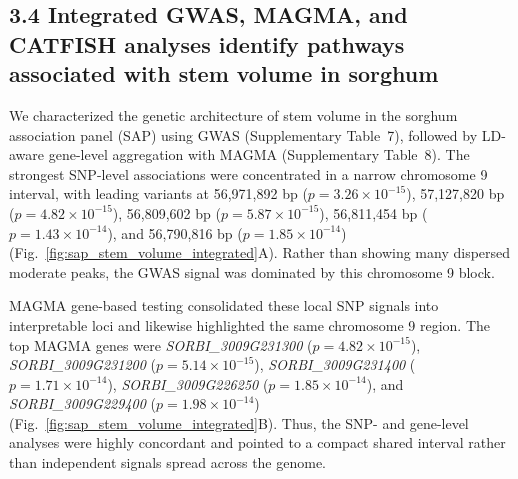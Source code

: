 \documentclass[unnumsec,webpdf,contemporary,large]{oup-authoring-template}%
\theoremstyle{thmstyleone}%
\theoremstyle{thmstyletwo}%
\theoremstyle{thmstylethree}%
\begin{document}
\subsection{3.4 Integrated GWAS, MAGMA, and CATFISH analyses identify pathways associated with stem volume in sorghum}

We characterized the genetic architecture of stem volume in the sorghum association panel (SAP) using GWAS (Supplementary Table~7), followed by LD-aware gene-level aggregation with MAGMA (Supplementary Table~8). The strongest SNP-level associations were concentrated in a narrow chromosome 9 interval, with leading variants at 56,971,892 bp ($p = 3.26 \times 10^{-15}$), 57,127,820 bp ($p = 4.82 \times 10^{-15}$), 56,809,602 bp ($p = 5.87 \times 10^{-15}$), 56,811,454 bp ($p = 1.43 \times 10^{-14}$), and 56,790,816 bp ($p = 1.85 \times 10^{-14}$) (Fig.~\ref{fig:sap_stem_volume_integrated}A). Rather than showing many dispersed moderate peaks, the GWAS signal was dominated by this chromosome 9 block.

MAGMA gene-based testing consolidated these local SNP signals into interpretable loci and likewise highlighted the same chromosome 9 region. The top MAGMA genes were \textit{SORBI\_3009G231300} ($p = 4.82 \times 10^{-15}$), \textit{SORBI\_3009G231200} ($p = 5.14 \times 10^{-15}$), \textit{SORBI\_3009G231400} ($p = 1.71 \times 10^{-14}$), \textit{SORBI\_3009G226250} ($p = 1.85 \times 10^{-14}$), and \textit{SORBI\_3009G229400} ($p = 1.98 \times 10^{-14}$) (Fig.~\ref{fig:sap_stem_volume_integrated}B). Thus, the SNP- and gene-level analyses were highly concordant and pointed to a compact shared interval rather than independent signals spread across the genome.
\end{document}
